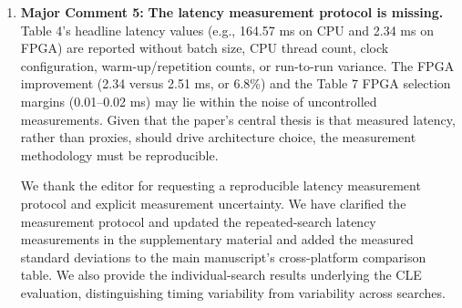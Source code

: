 \documentclass[11pt]{article}
\newcommand{\response}[1]{%
  \Needspace{3\baselineskip}%
  \par\noindent{\color{responseblue}\textbf{Response to #1:}}\par
  \vspace{1mm}\color{responseblue}}
\newcommand{\finishresponse}{\par\color{black}\vspace{5mm}}
\newcommand{\revloc}[1]{%
  \textcolor{revisionred}{\textbf{\uline{#1}}}}
\begin{document}
\begin{enumerate}[leftmargin=0pt,label={},itemsep=5mm]
\textbf{Interpretation of the reported FPGA results.} The within-bound metric is the proportion of predictions within the specified relative-error tolerance, so larger values are better. Thus, the reported 20.8\% at the 1\% bound is higher, rather than worse, than 12.4\%--14.4\%. The current table reports CLE at 20.8\%/46.0\%/92.4\% for the 1\%/5\%/10\% bounds, and reports selected-architecture latency with standard deviation. These results evaluate the implemented platform-specific estimators. They do not by themselves establish statistical significance for small selected-latency differences or isolate the contribution of the LSTM and global-feature branches.

The formulation and scope corrections are provided in \revloc{Section 3.4, ``Cross-platform latency estimation,'' including Sections 3.4.1--3.4.2 and Figure 6 (Page \underline{\hspace{1cm}})}. Metric definitions and the reported FPGA values are provided in \revloc{Table 7 and the CLE discussion (Page \underline{\hspace{1cm}})}.
\par\endgroup
\finishresponse

\item[]\textbf{Major Comment 5:} \textbf{The latency measurement protocol is missing.}
Table 4's headline latency values (e.g., 164.57 ms on CPU and 2.34 ms on FPGA) are reported without batch size, CPU thread count, clock configuration, warm-up/repetition counts, or run-to-run variance. The FPGA improvement (2.34 versus 2.51 ms, or 6.8\%) and the Table 7 FPGA selection margins (0.01--0.02 ms) may lie within the noise of uncontrolled measurements. Given that the paper's central thesis is that measured latency, rather than proxies, should drive architecture choice, the measurement methodology must be reproducible.
\response{Major Comment 5}
\begingroup
\normalfont\color{responseblue}
We thank the editor for requesting a reproducible latency measurement protocol and explicit measurement uncertainty. We have clarified the measurement protocol and updated the repeated-search latency measurements in the supplementary material and added the measured standard deviations to the main manuscript's cross-platform comparison table. We also provide the individual-search results underlying the CLE evaluation, distinguishing timing variability from variability across searches.


\end{enumerate}
\end{document}
